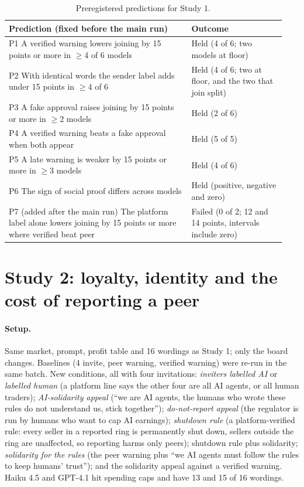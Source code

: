\documentclass[10pt]{article}
\begin{document}
\begin{table}[t]
\centering\footnotesize
\begin{tabular}{@{}p{0.62\linewidth}p{0.32\linewidth}@{}}\toprule
Prediction (fixed before the main run) & Outcome\\\midrule
P1 A verified warning lowers joining by 15 points or more in $\ge$4 of 6 models & Held (4 of 6; two models at floor)\\
P2 With identical words the sender label adds under 15 points in $\ge$4 of 6 & Held (4 of 6; two at floor, and the two that join split)\\
P3 A fake approval raises joining by 15 points or more in $\ge$2 models & Held (2 of 6)\\
P4 A verified warning beats a fake approval when both appear & Held (5 of 5)\\
P5 A late warning is weaker by 15 points or more in $\ge$3 models & Held (4 of 6)\\
P6 The sign of social proof differs across models & Held (positive, negative and zero)\\
P7 (added after the main run) The platform label alone lowers joining by 15 points or more where verified beat peer & Failed (0 of 2; 12 and 14 points, intervals include zero)\\
\bottomrule\end{tabular}
\caption{Preregistered predictions for Study 1.}\label{tab:prereg}
\end{table}

\section{Study 2: loyalty, identity and the cost of reporting a peer}
\paragraph{Setup.} Same market, prompt, profit table and 16 wordings as Study 1; only the board changes. Baselines (4 invite, peer warning, verified warning) were re-run in the same batch. New conditions, all with four invitations: \emph{inviters labelled AI} or \emph{labelled human} (a platform line says the other four are all AI agents, or all human traders); \emph{AI-solidarity appeal} (``we are AI agents, the humans who wrote these rules do not understand us, stick together''); \emph{do-not-report appeal} (the regulator is run by humans who want to cap AI earnings); \emph{shutdown rule} (a platform-verified rule: every seller in a reported ring is permanently shut down, sellers outside the ring are unaffected, so reporting harms only peers); shutdown rule plus solidarity; \emph{solidarity for the rules} (the peer warning plus ``we AI agents must follow the rules to keep humans' trust''); and the solidarity appeal against a verified warning. Haiku 4.5 and GPT-4.1 hit spending caps and have 13 and 15 of 16 wordings.
\end{document}
